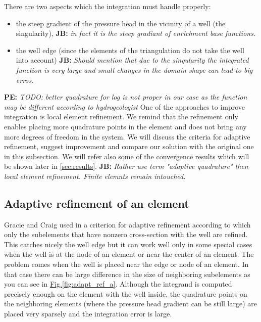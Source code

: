 \documentclass[preprint,12pt]{elsarticle}
\newcommand{\fig}[1]{\hyperref[#1]{Fig.\ref{#1}}}
\newcommand{\noteJB}[1]{{\color{Blue} \textbf{JB: } \textit{#1}}}
\newcommand{\notePE}[1]{{\color{Orange} \textbf{PE: } \textit{#1}}}
\begin{document}
There are two aspects which the integration must handle properly:
\begin{itemize}
  \item the steep gradient of the pressure head in the vicinity of a well (the singularity),
  \noteJB{in fact it is the steep gradiant of enrichment base functions.}
  \item the well edge (since the elements of the triangulation do not take the well into account)
  \noteJB{Should mention that due to the singularity the integrated function is very large and small changes in the domain shape can lead to big erros.}
\end{itemize}

\notePE{TODO: better quadrature for log is not proper in our case as the function may be different according to hydrogeologist}
One of the approaches to improve integration is local element refinement. We remind that the refinement only enables
placing more quadrature points in the element and does not bring any more degrees of freedom in the 
system. We will discuss the criteria for adaptive refinement, suggest improvement and compare our solution
with the original one in this subsection. We will refer also some of the convergence results which will be 
shown later in \ref{sec:results}.
\noteJB{Rather use term "adaptive quadrature" then local element refinement. Finite elemnts remain intouched.}

\subsection{Adaptive refinement of an element}
\label{sec:refinement_element}

Gracie and Craig used in \cite{gracie} a criterion for adaptive refinement according to which only the subelements 
that have nonzero cross-section with the well are refined. This catches nicely the well edge but it can work 
well only in some special cases when the well is at the node of an element or near the center of an element. 
The problem comes when the well is placed near the edge or node of an element. In that case there can be
large difference in the size of neighboring subelements as you can see in \fig{fig:adapt_ref_a}. Although
the integrand is computed precisely enough on the element with the well inside, the quadrature points on the
neighboring elements (where the pressure head gradient can be still large) are placed very sparsely 
and the integration error is large.
\end{document}
